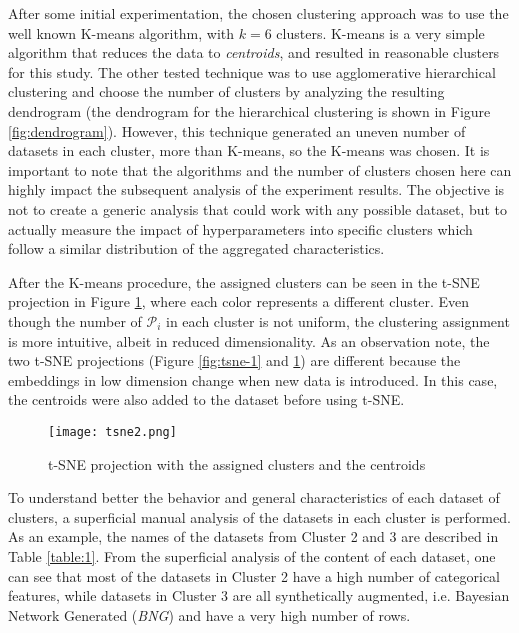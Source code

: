 After some initial experimentation, the chosen clustering approach was to use the well known K-means algorithm, with $k=6$ clusters. K-means is a very simple algorithm that reduces the data to \textit{centroids}, and resulted in reasonable clusters for this study. The other tested technique was to use agglomerative hierarchical clustering and choose the number of clusters by analyzing the resulting dendrogram (the dendrogram for the hierarchical clustering is shown in Figure \ref{fig:dendrogram}). However, this technique generated an uneven number of datasets in each cluster, more than K-means, so the K-means was chosen. It is important to note that the algorithms and the number of clusters chosen here can highly impact the subsequent analysis of the experiment results. The objective is not to create a generic analysis that could work with any possible dataset, but to actually measure the impact of hyperparameters into specific clusters which follow a similar distribution of the aggregated characteristics.

After the K-means procedure, the assigned clusters can be seen in the t-SNE projection in Figure \ref{fig:tsne-2}, where each color represents a different cluster. Even though the number of $\mathcal{P}_i$ in each cluster is not uniform, the clustering assignment is more intuitive, albeit in reduced dimensionality. As an observation note, the two t-SNE projections (Figure \ref{fig:tsne-1} and  \ref{fig:tsne-2}) are different because the embeddings in low dimension change when new data is introduced. In this case, the centroids were also added to the dataset before using t-SNE.

\begin{figure}[h!]
    \centering
    \texttt{[image: tsne2.png]}
    \caption{t-SNE projection with the assigned clusters and the centroids}
    \label{fig:tsne-2}
\end{figure}

To understand better the behavior and general characteristics of each dataset of clusters, a superficial manual analysis of the datasets in each cluster is performed. As an example, the names of the datasets from Cluster 2 and 3 are described in Table \ref{table:1}. From the superficial analysis of the content of each dataset, one can see that most of the datasets in Cluster 2 have a high number of categorical features, while datasets in Cluster 3 are all synthetically augmented, i.e. Bayesian Network Generated (\textit{BNG}) and have a very high number of rows.

